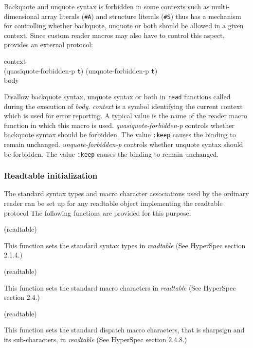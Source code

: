 Backquote and unquote syntax is forbidden in some contexts such as
multi-dimensional array literals (\texttt{\#A}) and structure literals
(\texttt{\#S}) thus \sysname{} has a mechanism for controlling whether
backquote, unquote or both should be allowed in a given context.
Since custom reader macros may also have to control this aspect,
\sysname{} provides an external protocol:

 {context\\
  \optional
  (quasiquote-forbidden-p \texttt{t})
  (unquote-forbidden-p \texttt{t})\\
  \body body}

Disallow backquote syntax, unquote syntax or both in \texttt{read}
functions called during the execution of \textit{body}.
\textit{context} is a symbol identifying the current context which is
used for error reporting.  A typical value is the name of the reader
macro function in which this macro is used.
\textit{quasiquote-forbidden-p} controls whether backquote syntax
should be forbidden.  The value \texttt{:keep} causes the binding to
remain unchanged.  \textit{unquote-forbidden-p} controls whether
unquote syntax should be forbidden.  The value \texttt{:keep} causes
the binding to remain unchanged.

\subsubsection{Readtable initialization}
\label{sec:readtable-initialization}

The standard syntax types and macro character associations used by the
ordinary reader can be set up for any readtable object implementing
the readtable protocol   The following
functions are provided for this purpose:

 (readtable)

This function sets the standard syntax types in \textit{readtable}
(See HyperSpec section 2.1.4.)

 (readtable)

This function sets the standard macro characters in \textit{readtable}
(See HyperSpec section 2.4.)

 (readtable)

This function sets the standard dispatch macro characters, that is
sharpsign and its sub-characters, in \textit{readtable} (See HyperSpec
section 2.4.8.)

